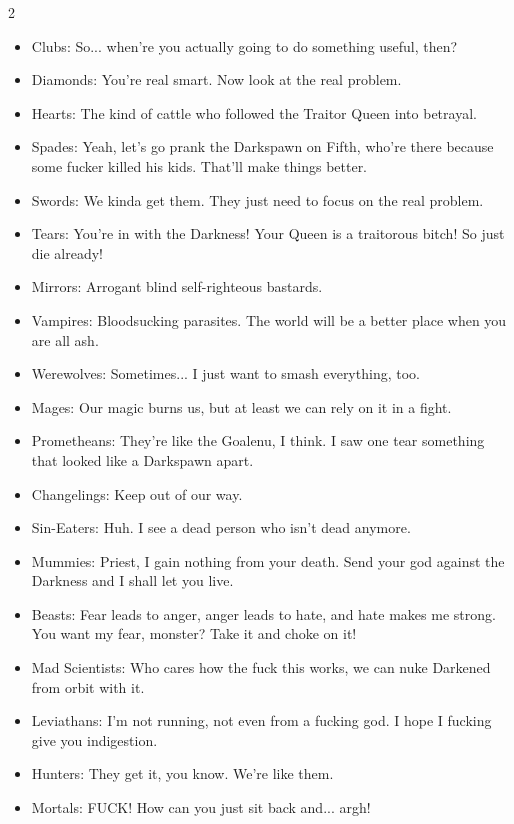 \begin{multicols}{2}
\begin{itemize}
\item Clubs: So... when're you actually going to do something useful, then?
\item Diamonds: You're real smart. Now look at the real problem.
\item Hearts: The kind of cattle who followed the Traitor Queen into betrayal.
\item Spades: Yeah, let's go prank the Darkspawn on Fifth, who're there because some fucker killed his kids. That'll make things better.
\item Swords: We kinda get them. They just need to focus on the real problem.
\item Tears: You're in with the Darkness! Your Queen is a traitorous bitch! So just die already!
\item Mirrors: Arrogant blind self-righteous bastards.

\item Vampires: Bloodsucking parasites. The world will be a better place when you are all ash.
\item Werewolves: Sometimes... I just want to smash everything, too.
\item Mages: Our magic burns us, but at least we can rely on it in a fight. 
\item Prometheans: They're like the Goalenu, I think. I saw one tear something that looked like a Darkspawn apart. 
\item Changelings: Keep out of our way.
\item Sin-Eaters: Huh. I see a dead person who isn't dead anymore.
\item Mummies: Priest, I gain nothing from your death. Send your god against the Darkness and I shall let you live. 
\item Beasts: Fear leads to anger, anger leads to hate, and hate makes me strong. You want my fear, monster? Take it and choke on it!
\item Mad Scientists: Who cares how the fuck this works, we can nuke Darkened from orbit with it.
\item Leviathans: I'm not running, not even from a fucking god. I hope I fucking give you indigestion. 

\item Hunters: They get it, you know. We're like them.
\item Mortals: FUCK! How can you just sit back and... argh! 
\end{itemize}


\end{multicols}
